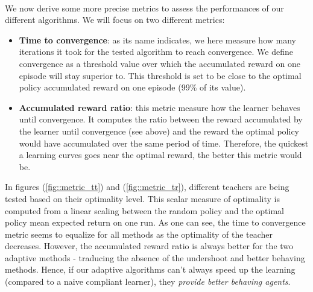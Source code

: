\documentclass[a4paper]{report}
\begin{document}
{{{{				\paragraph{} We now derive some more precise metrics to assess the performances of our different algorithms. We will focus on two different metrics: 
				\begin{itemize}[label=$\cdot$]
					\item \textbf{Time to convergence}: as its name indicates, we here measure how many iterations it took for the tested algorithm to reach convergence. We define convergence as a threshold value over which the accumulated reward on one episode will stay superior to. This threshold is set to be close to the optimal policy accumulated reward on one episode (99\% of its value). 
					\item \textbf{Accumulated reward ratio}: this metric measure how the learner behaves until convergence. It computes the ratio between the reward accumulated by the learner until convergence (see above) and the reward the optimal policy would have accumulated over the same period of time. Therefore, the quickest a learning curves goes near the optimal reward, the better this metric would be. 
				\end{itemize}
				 In figures (\ref{fig::metric_tt}) and (\ref{fig::metric_tr}), different teachers are being tested based on their optimality level. This scalar measure of optimality is computed from a linear scaling between the random policy and the optimal policy mean expected return on one run. As one can see, the time to convergence metric seems to equalize for all methods as the optimality of the teacher decreases. However, the accumulated reward ratio is always better for the two adaptive methods - traducing the absence of the undershoot and better behaving methods. Hence, if our adaptive algorithms can't always speed up the learning (compared to a naive compliant learner), they \emph{provide better behaving agents}. 
				
}}}}
\end{document}
